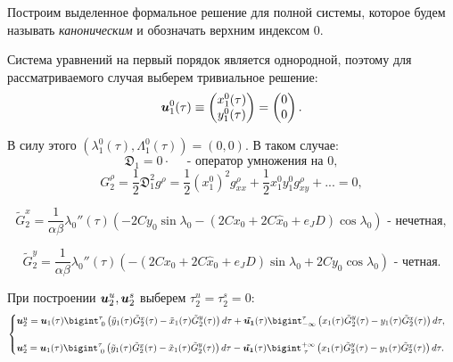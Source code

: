 Построим выделенное формальное решение для полной системы, которое будем называть \textit{каноническим} и обозначать верхним индексом $0$.

Система уравнений на первый порядок является однородной, поэтому для рассматриваемого случая выберем тривиальное решение:
\begin{align*}
    \boldsymbol{u}^0_1(\tau) \equiv \begin{pmatrix} x^0_1(\tau) \\ y^0_1(\tau) \end{pmatrix} = \begin{pmatrix} 0 \\ 0 \end{pmatrix}.
\end{align*}

В силу этого $(\lambda^0_1(\tau), \Lambda^0_1(\tau)) = (0,0)$. В таком случае:
$$\mathfrak{D}_1 = 0 \cdot \quad \text{ - оператор умножения на 0},$$
$$G_2^\rho = \frac12 \mathfrak{D}_1^2 g^\rho = \frac12 (x^0_1)^2 g^\rho_{xx} + \frac12 x^0_1 y^0_1 g^\rho_{xy} + ... = 0,$$

$$\tilde G_2^x  = \frac{1}{\alpha \beta} \lambda_0''(\tau) \left( -2Cy_0 \sin\lambda_0 - (2Cx_0+2C \hat x_0+e_JD) \cos\lambda_0 \right) \text{ - нечетная},$$

$$\tilde G_2^y  = \frac{1}{\alpha \beta} \lambda_0''(\tau) \left( -(2Cx_0+2C \hat x_0+e_JD) \sin\lambda_0 + 2Cy_0 \cos\lambda_0 \right) \text{ - четная}.$$

При построении $\boldsymbol{u}_2^u,\boldsymbol{u}_2^s$ выберем $\tau^u_2 = \tau^s_2 = 0$:
\begin{equation*}
    \begin{cases}
        \v u_2^u = 
        \v u_1(\tau)\bigint_{\text{ } 0}^\tau \left( \tilde y_1(\tau) \tilde G_2^x(\tau) - \tilde x_1(\tau) \tilde G_2^y(\tau) \right) d \tau + 
        \v{ \tilde{u_1}}(\tau) \bigint_{-\infty}^\tau \left( x_1(\tau) \tilde G_2^y(\tau) - y_1(\tau) \tilde G_2^x(\tau) \right) d \tau,\\
        \\
        
        \v u_2^s = 
        \v u_1(\tau)\bigint_{\text{ } 0}^{\tau} \left( \tilde y_1(\tau) \tilde G_2^x(\tau) - \tilde x_1(\tau) \tilde G_2^y(\tau) \right) d \tau - 
        \v{ \tilde{u_1}}(\tau) \bigint_{\text{ } \tau}^{+\infty} \left( x_1(\tau) \tilde G_2^y(\tau) - y_1(\tau) \tilde G_2^x(\tau) \right) d \tau. \\
    \end{cases}
\end{equation*}

